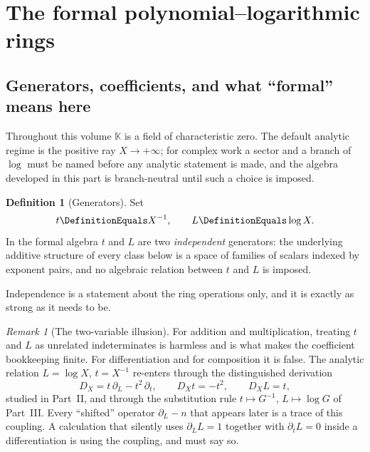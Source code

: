 \documentclass[11pt,oneside]{article}
\theoremstyle{plain}
\theoremstyle{definition}
\newtheorem{definition}[theorem]{Definition}
\theoremstyle{remark}
\newtheorem{remark}[theorem]{Remark}
\newcommand{\K}{\mathbb{K}}
\newcommand{\DX}{D_{X}}                                  %
\begin{document}
\section{The formal polynomial--logarithmic rings}
\label{plt:sec:rings}

\subsection{Generators, coefficients, and what ``formal'' means here}
\label{plt:sec:ring-generators}

Throughout this volume \(\K\) is a field of characteristic zero.  The default
analytic regime is the positive ray \(X\to+\infty\); for complex work a sector
and a branch of \(\log\) must be named before any analytic statement is made,
and the algebra developed in this part is branch-neutral until such a choice is
imposed.

\begin{definition}[Generators]
\label{plt:def:ring-generators}
Set
\begin{equation}\label{plt:eq:ring-generators}
  t\DefinitionEquals X^{-1},
  \qquad
  L\DefinitionEquals\log X .
\end{equation}
In the formal algebra \(t\) and \(L\) are two \emph{independent} generators:
the underlying additive structure of every class below is a space of families
of scalars indexed by exponent pairs, and no algebraic relation between \(t\)
and \(L\) is imposed.
\end{definition}

Independence is a statement about the ring operations only, and it is exactly
as strong as it needs to be.

\begin{remark}[The two-variable illusion]
\label{plt:rmk:ring-two-variable}
For addition and multiplication, treating \(t\) and \(L\) as unrelated
indeterminates is harmless and is what makes the coefficient bookkeeping
finite.  For differentiation and for composition it is false.  The analytic
relation \(L=\log X\), \(t=X^{-1}\) re-enters through the distinguished
derivation
\[
  \DX=t\,\partial_L-t^2\,\partial_t,
  \qquad
  \DX t=-t^2,\qquad \DX L=t,
\]
studied in Part~II, and through the substitution rule
\(t\mapsto G^{-1}\), \(L\mapsto\log G\) of Part~III.  Every ``shifted''
operator \(\partial_L-n\) that appears later is a trace of this coupling.  A
calculation that silently uses \(\partial_L L=1\) together with
\(\partial_t L=0\) inside a differentiation is using the coupling, and must
say so.
\end{remark}
\end{document}
